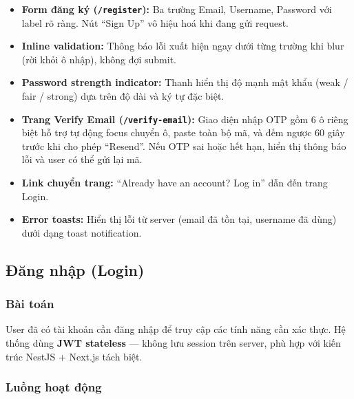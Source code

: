 \documentclass[12pt,a4paper]{article}
\begin{document}
\begin{itemize}
  \item \textbf{Form đăng ký (\texttt{/register}):} Ba trường Email, Username,
        Password với label rõ ràng. Nút ``Sign Up'' vô hiệu hoá khi đang gửi
        request.
  \item \textbf{Inline validation:} Thông báo lỗi xuất hiện ngay dưới từng
        trường khi blur (rời khỏi ô nhập), không đợi submit.
  \item \textbf{Password strength indicator:} Thanh hiển thị độ mạnh mật
        khẩu (weak / fair / strong) dựa trên độ dài và ký tự đặc biệt.
  \item \textbf{Trang Verify Email (\texttt{/verify-email}):} Giao diện nhập
        OTP gồm 6 ô riêng biệt hỗ trợ tự động focus chuyển ô, paste toàn bộ
        mã, và đếm ngược 60 giây trước khi cho phép ``Resend''. Nếu OTP sai
        hoặc hết hạn, hiển thị thông báo lỗi và user có thể gửi lại mã.
  \item \textbf{Link chuyển trang:} ``Already have an account? Log in'' dẫn
        đến trang Login.
  \item \textbf{Error toasts:} Hiển thị lỗi từ server (email đã tồn tại,
        username đã dùng) dưới dạng toast notification.
\end{itemize}

\subsection{Đăng nhập (Login)}

\subsubsection{Bài toán}

User đã có tài khoản cần đăng nhập để truy cập các tính năng cần xác thực.
Hệ thống dùng \textbf{JWT stateless} --- không lưu session trên server, phù
hợp với kiến trúc NestJS + Next.js tách biệt.

\subsubsection{Luồng hoạt động}
\end{document}
